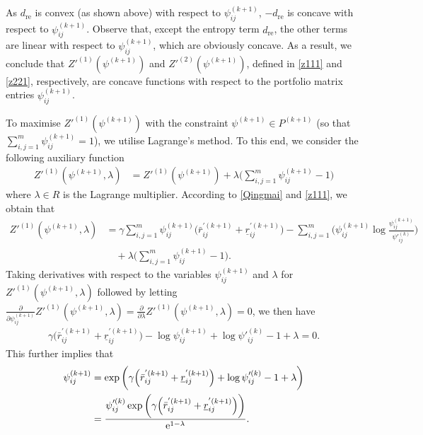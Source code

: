 \documentclass[11pt]{article}
\numberwithin{equation}{section}
\begin{document}
As $d_{\mbox{re}}$ is convex (as shown above) with respect to $\psi^{(k+1)}_{ij}$, $-d_{\mbox{re}}$ is concave with respect to $\psi^{(k+1)}_{ij}$. Observe that, except the entropy term $d_{\mbox{re}}$, 
the other terms are linear with respect to $\psi^{(k+1)}_{ij}$, which are obviously concave. As a result, we conclude that $Z'^{(1)}(\psi^{(k+1)})$ and $Z'^{(2)} (\psi^{(k+1)})$, defined 
in \eqref{z111} and \eqref{z221}, respectively,  are concave functions with respect to the portfolio matrix entries $\psi^{(k+1)}_{ij}$.

To maximise $Z'^{(1)}(\psi^{(k+1)})$ with the constraint $\psi^{(k+1)}\in P^{(k+1)}$ (so that $\sum_{i,j=1}^m\psi^{(k+1)}_{ij}=1$), we utilise Lagrange's method. 
To this end,  we consider the following auxiliary function
\begin{equation*}
\begin{split}
Z'^{(1)}(\psi^{(k+1)},\lambda)&=Z'^{(1)}(\psi^{(k+1)})+\lambda\Big(\sum_{i,j=1}^m\psi^{(k+1)}_{ij}-1\Big) 
\end{split}
\end{equation*}
where $\lambda\in  R$ is the Lagrange multiplier. According to \eqref{Qingmai} and \eqref{z111}, we obtain that 
\begin{equation}\label{baby}
\begin{split}
Z'^{(1)}(\psi^{(k+1)},\lambda)&=\gamma\sum_{i,j=1}^{m}\psi^{(k+1)}_{ij}\Big(\bar r_{ij}^{'(k+1)}+\underline r_{ij}^{'(k+1)}\Big)-\sum_{i,j=1}^{m}\bigg(\psi^{(k+1)}_{ij}\log\frac{\psi^{(k+1)}_{ij}}{\psi'^{(k)}_{ij}}\bigg)\\
&\quad+\lambda\Big(\sum_{i,j=1}^m\psi^{(k+1)}_{ij}-1\Big).
\end{split}
\end{equation}
Taking derivatives with respect to the variables $\psi^{(k+1)}_{ij}$ and $\lambda$ for $Z'^{(1)}(\psi^{(k+1)},\lambda)$ followed by letting $\frac{\partial }{\partial \psi^{(k+1)}_{ij}}Z'^{(1)}(\psi^{(k+1)},\lambda)=\frac{\partial }{\partial \lambda }Z'^{(1)}(\psi^{(k+1)},\lambda)=0$, we then have 
\begin{equation*}
\begin{split}
\gamma\Big(\bar r_{ij}^{'(k+1)}+\underline r_{ij}^{'(k+1)}\Big)-\log\psi^{(k+1)}_{ij} +\log\psi'^{(k)}_{ij}-1+\lambda=0.
\end{split}
\end{equation*}
This further implies that 
\begin{equation}\label{ba}
\begin{split}
\psi^{(k+1)}_{ij}&=\exp\bigg(\gamma\Big(\bar r_{ij}^{'(k+1)}+\underline r_{ij}^{'(k+1)}\Big)+\log\psi'^{(k)}_{ij}-1+\lambda\bigg)\\
&=\frac{\psi'^{(k)}_{ij}\exp\bigg(\gamma\Big(\bar r_{ij}^{'(k+1)}+\underline r_{ij}^{'(k+1)}\Big)\bigg)}{\text{\rm{e}}^{1-\lambda}}.
\end{split}
\end{equation}
\end{document}
